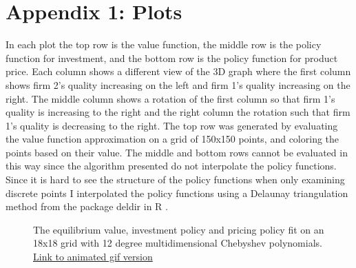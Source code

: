 \documentclass[12pt]{article}
\begin{document}



\section*{Appendix 1: Plots}

In each plot the top row is the value function, the middle row is the policy function for investment, and the bottom row is the policy function for product price. Each column shows a different view of the 3D graph where the first column shows firm 2's quality increasing on the left and firm 1's quality increasing on the right. The middle column shows a rotation of the first column so that firm 1's quality is increasing to the right and the right column the rotation such that firm 1's quality is decreasing to the right. The top row was generated by evaluating the value function approximation on a grid of 150x150 points, and coloring the points based on their value. The middle and bottom rows cannot be evaluated in this way since the algorithm presented do not interpolate the policy functions. Since it is hard to see the structure of the policy functions when only examining discrete points I interpolated the policy functions using a Delaunay triangulation method from the package deldir in R \citep{deldir}.

\begin{figure}[H]
  \centering
  \caption{The equilibrium value, investment policy and pricing policy fit on an 18x18 grid with 12 degree multidimensional Chebyshev polynomials. \href{https://github.com/wmjones/VFA-for-dynamic-games/blob/master/gif_cai_18_12.gif}{Link to animated gif version}}
\end{figure}
\end{document}
